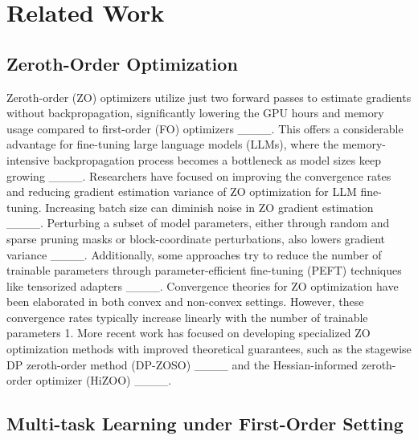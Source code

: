 \section{Related Work}
\subsection{Zeroth-Order Optimization}
Zeroth-order (ZO) optimizers utilize just two forward passes to estimate gradients without backpropagation, significantly lowering the GPU hours and memory usage compared to first-order (FO) optimizers ____. This offers a considerable advantage for fine-tuning large language models (LLMs), where the memory-intensive backpropagation process becomes a bottleneck as model sizes keep growing ____.
Researchers have focused on improving the convergence rates and reducing gradient estimation variance of ZO optimization for LLM fine-tuning. Increasing batch size can diminish noise in ZO gradient estimation ____. Perturbing a subset of model parameters, either through random and sparse pruning masks or block-coordinate perturbations, also lowers gradient variance ____. Additionally, some approaches try to reduce the number of trainable parameters through parameter-efficient fine-tuning (PEFT) techniques like tensorized adapters ____.
Convergence theories for ZO optimization have been elaborated in both convex and non-convex settings. However, these convergence rates typically increase linearly with the number of trainable parameters 1. More recent work has focused on developing specialized ZO optimization methods with improved theoretical guarantees, such as the stagewise DP zeroth-order method (DP-ZOSO) ____ and the Hessian-informed zeroth-order optimizer (HiZOO) ____.

\subsection{Multi-task Learning under First-Order Setting}

